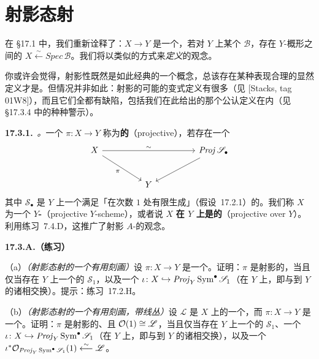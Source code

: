 
\section{射影态射}

在 \S17.1 中，我们重新诠释了\trAffine\trMorphism：$X\to Y$ 是一个\trAffine\trMorphism，若对 $Y$ 上某个\trQC{}\trSheafOfAlgebras{} $\mathscr{B}$，存在 $Y$-概形之间的\trIsomorphism{} $X\overset{\sim}{\longleftarrow}\mathit{Spec}\,\mathscr{B}$。我们将以类似的方式来\emph{定义}\trProjective\trMorphism{}的观念。

你或许会觉得，射影性既然是如此经典的一个概念，总该存在某种表现合理的显然定义才是。但情况并非如此：射影的可能的变式定义有很多（见 [Stacks, tag 01W8]），而且它们全都有缺陷，包括我们在此给出的那个公认定义在内（见 \S17.3.4 中的种种警示）。

\textbf{17.3.1.}\ \emph{\trhDefinition{}。}\quad 一个\trMorphism{} $\pi\colon X\to Y$ 称为\textbf{\trProjective{}的}（projective），若存在一个\trIsomorphism
\[
\begin{tikzcd}[row sep=2.4em, column sep=4.6em]
X \ar[rr, "\sim"] \ar[dr, "\pi"'] && \mathit{Proj}\,\mathscr{S}_\bullet \ar[dl] \\
& Y &
\end{tikzcd}
\]
其中 $\mathscr{S}_\bullet$ 是 $Y$ 上一个满足「在次数 $1$ 处有限生成」（\mbox{假设~17.2.1}）的\trQC{}\trSheafOfAlgebras。我们称 $X$ 为一个\textbf{\trProjective{} $Y$-\trScheme}（projective $Y$-scheme），或者说 $X$ \textbf{在 $Y$ 上是\trProjective{}的}（projective over $Y$）。利用\mbox{练习~7.4.D}，这推广了射影 $A$-\trScheme{}的观念。

\textbf{17.3.A.（练习）}

（a）\emph{（射影态射的一个有用刻画）}设 $\pi\colon X\to Y$ 是一个\trMorphism。证明：$\pi$ 是射影的，当且仅当存在 $Y$ 上一个\trFiniteType{}的\trQCSheaf{} $\mathscr{S}_1$，以及一个\trClosedEmbedding{} $\iota\colon X\hookrightarrow\mathit{Proj}_Y\operatorname{Sym}^\bullet\mathscr{S}_1$（在 $Y$ 上，即与到 $Y$ 的诸\trMap{}相交换）。提示：\mbox{练习~17.2.H}。

（b）\emph{（射影态射的一个有用刻画，带线丛）}设 $\mathscr{L}$ 是 $X$ 上的一个\trInvertibleSheaf，而 $\pi\colon X\to Y$ 是一个\trMorphism。证明：$\pi$ 是射影的、且 $\mathcal{O}(1)\cong\mathscr{L}$，当且仅当存在 $Y$ 上一个\trFiniteType{}的\trQCSheaf{} $\mathscr{S}_1$、一个\trClosedEmbedding{} $\iota\colon X\hookrightarrow\mathit{Proj}_Y\operatorname{Sym}^\bullet\mathscr{S}_1$（在 $Y$ 上，即与到 $Y$ 的诸\trMap{}相交换），以及一个\trIsomorphism{} $\iota^*\mathcal{O}_{\mathit{Proj}_Y\operatorname{Sym}^\bullet\mathscr{S}_1}(1)\overset{\sim}{\longleftarrow}\mathscr{L}$。

